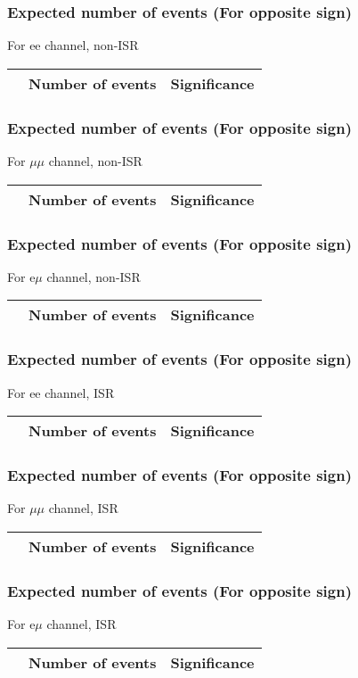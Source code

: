 \begin{frame}
\frametitle{Expected number of events (For opposite sign)}
For ee channel, non-ISR\\
\vspace{5mm}
\begin{tabular}{|c|c|c|}
\hline
& Number of events & Significance \\
\hline

\end{tabular}
\end{frame}

\begin{frame}
\frametitle{Expected number of events (For opposite sign)}
For $\mu\mu$ channel, non-ISR\\
\vspace{5mm}
\begin{tabular}{|c|c|c|}
\hline
& Number of events & Significance \\
\hline

\end{tabular}
\end{frame}

\begin{frame}
\frametitle{Expected number of events (For opposite sign)}
For e$\mu$ channel, non-ISR\\
\vspace{5mm}
\begin{tabular}{|c|c|c|}
\hline
& Number of events & Significance \\
\hline

\end{tabular}
\end{frame}

\begin{frame}
\frametitle{Expected number of events (For opposite sign)}
For ee channel, ISR\\
\vspace{5mm}
\begin{tabular}{|c|c|c|}
\hline
& Number of events & Significance \\
\hline

\end{tabular}
\end{frame}

\begin{frame}
\frametitle{Expected number of events (For opposite sign)}
For $\mu\mu$ channel, ISR\\
\vspace{5mm}
\begin{tabular}{|c|c|c|}
\hline
& Number of events & Significance \\
\hline

\end{tabular}
\end{frame}

\begin{frame}
\frametitle{Expected number of events (For opposite sign)}
For e$\mu$ channel, ISR\\
\vspace{5mm}
\begin{tabular}{|c|c|c|}
\hline
& Number of events & Significance \\
\hline

\end{tabular}
\end{frame}

